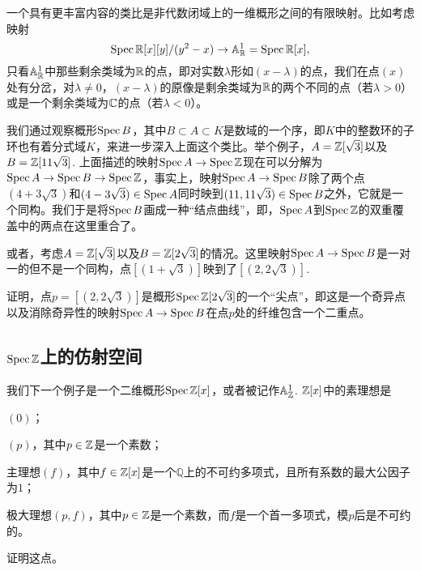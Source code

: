 
一个具有更丰富内容的类比是非代数闭域上的一维概形之间的有限映射。比如考虑映射
\[
	\operatorname{Spec} \mathbb{R}[x][y]/(y^2-x)\to \mathbb{A}_{\mathbb{R}}^1=\operatorname{Spec} \mathbb{R}[x],
\]
只看$\mathbb{A}_{\mathbb{R}}^1$中那些剩余类域为$\mathbb{R}$的点，即对实数$\lambda$形如$(x-\lambda)$的点，我们在点$(x)$处有分岔，对$\lambda\neq 0$，$(x-\lambda)$的原像是剩余类域为$\mathbb{R}$的两个不同的点（若$\lambda>0$）或是一个剩余类域为$\mathbb{C}$的点（若$\lambda<0$）。

我们通过观察概形$\operatorname{Spec} B$，其中$B\subset A\subset K$是数域的一个序，即$K$中的整数环的子环也有着分式域$K$，来进一步深入上面这个类比。举个例子，$A=\mathbb{Z}[\sqrt 3]$以及$B=\mathbb{Z}[11\sqrt 3]$. 上面描述的映射$\operatorname{Spec} A\to \operatorname{Spec} \mathbb{Z}$现在可以分解为$\operatorname{Spec} A\to \operatorname{Spec} B\to \operatorname{Spec} \mathbb{Z}$，事实上，映射$\operatorname{Spec} A\to \operatorname{Spec} B$除了两个点$(4+3\sqrt 3)$和$(4-3\sqrt 3)\in \operatorname{Spec} A$同时映到$(11,11\sqrt 3)\in\operatorname{Spec} B$之外，它就是一个同构。我们于是将$\operatorname{Spec} B$画成一种“结点曲线”，即，$\operatorname{Spec} A$到$\operatorname{Spec} \mathbb{Z}$的双重覆盖中的两点在这里重合了。


或者，考虑$A=\mathbb{Z}[\sqrt 3]$以及$B=\mathbb{Z}[2\sqrt 3]$的情况。这里映射$\operatorname{Spec} A\to\operatorname{Spec} B$是一对一的但不是一个同构，点$[(1+\sqrt 3)]$映到了$[(2,2\sqrt{3})]$.

\begin{exe}
	证明，点$p=[(2,2\sqrt{3})]$是概形$\operatorname{Spec} \mathbb{Z}[2\sqrt 3]$的一个“尖点”，即这是一个奇异点以及消除奇异性的映射$\operatorname{Spec} A\to \operatorname{Spec} B$在点$p$处的纤维包含一个二重点。
\end{exe}

\subsection{$\operatorname{Spec} \mathbb{Z}$上的仿射空间}

我们下一个例子是一个二维概形$\operatorname{Spec} \mathbb{Z}[x]$，或者被记作$\mathbb{A}_{\mathbb{Z}}^1$. $\mathbb{Z}[x]$中的素理想是
\begin{compactenum}[(i)]
	\item $(0)$；
	\item $(p)$，其中$p\in\mathbb{Z}$是一个素数；
	\item 主理想$(f)$，其中$f\in\mathbb{Z}[x]$是一个$\mathbb{Q}$上的不可约多项式，且所有系数的最大公因子为$1$；
	\item 极大理想$(p,f)$，其中$p\in \mathbb{Z}$是一个素数，而$f$是一个首一多项式，模$p$后是不可约的。
\end{compactenum}

\begin{exe}
	证明这点。
\end{exe}

